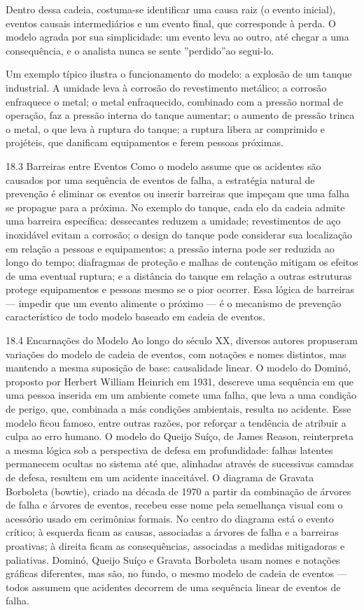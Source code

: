 Dentro dessa cadeia, costuma-se identificar uma causa raiz (o evento inicial), eventos causais intermediários e um evento final, que corresponde à perda. O modelo agrada por sua simplicidade: um evento leva ao outro, até chegar a uma consequência, e o analista nunca se sente ”perdido”ao segui-lo.

Um exemplo típico ilustra o funcionamento do modelo: a explosão de um tanque industrial. A umidade leva à corrosão do revestimento metálico; a corrosão enfraquece o metal; o metal enfraquecido, combinado com a pressão normal de operação, faz a pressão interna do tanque aumentar; o aumento de pressão trinca o metal, o que leva à ruptura do tanque; a ruptura libera ar comprimido e projéteis, que danificam equipamentos e ferem pessoas próximas.

18.3 Barreiras entre Eventos Como o modelo assume que os acidentes são causados por uma sequência de eventos de falha, a estratégia natural de prevenção é eliminar os eventos ou inserir barreiras que impeçam que uma falha se propague para a próxima. No exemplo do tanque, cada elo da cadeia admite uma barreira específica: dessecantes reduzem a umidade; revestimentos de aço inoxidável evitam a corrosão; o design do tanque pode considerar sua localização em relação a pessoas e equipamentos; a pressão interna pode ser reduzida ao longo do tempo; diafragmas de proteção e malhas de contenção mitigam os efeitos de uma eventual ruptura; e a distância do tanque em relação a outras estruturas protege equipamentos e pessoas mesmo se o pior ocorrer. Essa lógica de barreiras — impedir que um evento alimente o próximo — é o mecanismo de prevenção característico de todo modelo baseado em cadeia de eventos.

18.4 Encarnações do Modelo Ao longo do século XX, diversos autores propuseram variações do modelo de cadeia de eventos, com notações e nomes distintos, mas mantendo a mesma suposição de base: causalidade linear. O modelo do Dominó, proposto por Herbert William Heinrich em 1931, descreve uma sequência em que uma pessoa inserida em um ambiente comete uma falha, que leva a uma condição de perigo, que, combinada a más condições ambientais, resulta no acidente. Esse modelo ficou famoso, entre outras razões, por reforçar a tendência de atribuir a culpa ao erro humano. O modelo do Queijo Suíço, de James Reason, reinterpreta a mesma lógica sob a perspectiva de defesa em profundidade: falhas latentes permanecem ocultas no sistema até que, alinhadas através de sucessivas camadas de defesa, resultem em um acidente inaceitável. O diagrama de Gravata Borboleta (bowtie), criado na década de 1970 a partir da combinação de árvores de falha e árvores de eventos, recebeu esse nome pela semelhança visual com o acessório usado em cerimônias formais. No centro do diagrama está o evento crítico; à esquerda ficam as causas, associadas a árvores de falha e a barreiras proativas; à direita ficam as consequências, associadas a medidas mitigadoras e paliativas. Dominó, Queijo Suíço e Gravata Borboleta usam nomes e notações gráficas diferentes, mas são, no fundo, o mesmo modelo de cadeia de eventos — todos assumem que acidentes decorrem de uma sequência linear de eventos de falha.

